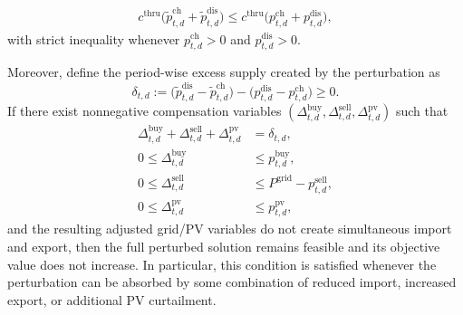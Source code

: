 \begin{proposition}
\begin{enumerate}
  \begin{align}
  c^{\mathrm{thru}}\big(\widetilde p^{\mathrm{ch}}_{t,d}+\widetilde p^{\mathrm{dis}}_{t,d}\big)
  \le c^{\mathrm{thru}}\big(p^{\mathrm{ch}}_{t,d}+p^{\mathrm{dis}}_{t,d}\big),
  \label{eq:10a-storage-mode-throughput-improvement}
  \end{align}
  with strict inequality whenever \(p^{\mathrm{ch}}_{t,d}>0\) and \(p^{\mathrm{dis}}_{t,d}>0\).
\end{enumerate}
Moreover, define the period-wise excess supply created by the perturbation as
\begin{equation}
\delta_{t,d} := \big(\widetilde p^{\mathrm{dis}}_{t,d}-\widetilde p^{\mathrm{ch}}_{t,d}\big) - \big(p^{\mathrm{dis}}_{t,d}-p^{\mathrm{ch}}_{t,d}\big) \ge 0.
\label{eq:10a-storage-mode-delta}
\end{equation}
If there exist nonnegative compensation variables \((\Delta^{\mathrm{buy}}_{t,d},\Delta^{\mathrm{sell}}_{t,d},\Delta^{\mathrm{pv}}_{t,d})\) such that
\begin{equation}
\begin{aligned}
\Delta^{\mathrm{buy}}_{t,d} + \Delta^{\mathrm{sell}}_{t,d} + \Delta^{\mathrm{pv}}_{t,d} &= \delta_{t,d}, \\
0 \le \Delta^{\mathrm{buy}}_{t,d} &\le p^{\mathrm{buy}}_{t,d}, \\
0 \le \Delta^{\mathrm{sell}}_{t,d} &\le P^{\mathrm{grid}} - p^{\mathrm{sell}}_{t,d}, \\
0 \le \Delta^{\mathrm{pv}}_{t,d} &\le p^{\mathrm{pv}}_{t,d},
\end{aligned}
\label{eq:10a-storage-mode-compensation-balance}
\end{equation}
and the resulting adjusted grid/PV variables do not create simultaneous import and export, then the full perturbed solution remains feasible and its objective value does not increase. In particular, this condition is satisfied whenever the perturbation can be absorbed by some combination of reduced import, increased export, or additional PV curtailment.
\end{proposition}

